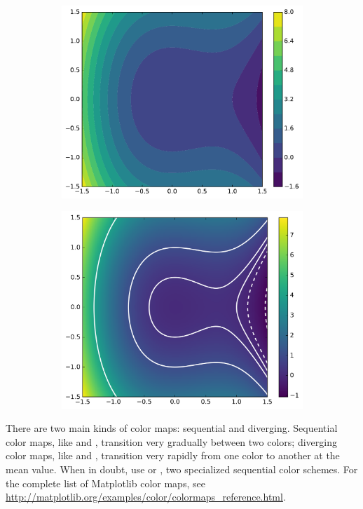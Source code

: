 \begin{figure}[H]
\begin{subfigure}{.495\textwidth}
    \centering
    \includegraphics[width=\linewidth]{figures/contour_2.pdf}
\end{subfigure}
%
\begin{subfigure}{.495\textwidth}
    \centering
    \includegraphics[width=\linewidth]{figures/heatmap_2.png}
\end{subfigure}
\end{figure}

There are two main kinds of color maps: sequential and diverging.
Sequential color maps, like  and , transition very gradually between two colors; diverging color maps, like  and , transition very rapidly from one color to another at the mean value.
When in doubt, use  or , two specialized sequential color schemes.
For the complete list of Matplotlib color maps, see \url{http://matplotlib.org/examples/color/colormaps_reference.html}.

